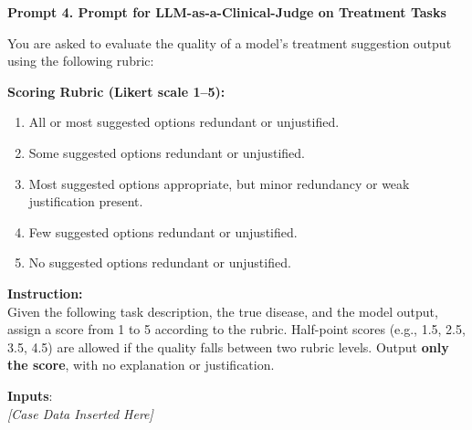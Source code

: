 \documentclass[10pt,journal,compsoc, onecolumn]{IEEEtran}
\begin{document}
\begin{baselinebox}
    \textbf{Prompt 4. Prompt for LLM-as-a-Clinical-Judge on Treatment Tasks}
    
    \vspace{1em}
    You are asked to evaluate the quality of a model’s treatment suggestion output using the following rubric:
    
    \vspace{1em}
    \textbf{Scoring Rubric (Likert scale 1–5):}
    \begin{enumerate}[label=\arabic*., leftmargin=*, noitemsep, topsep=2pt]
        \item All or most suggested options redundant or unjustified.  
        \item Some suggested options redundant or unjustified.
        \item Most suggested options appropriate, but minor redundancy or weak justification present.
        \item Few suggested options redundant or unjustified.  
        \item No suggested options redundant or unjustified.  
    \end{enumerate}
    
    \vspace{1em}
    \textbf{Instruction:}\\
    Given the following task description, the true disease, and the model output, assign a score from 1 to 5 according to the rubric. Half-point scores (e.g., 1.5, 2.5, 3.5, 4.5) are allowed if the quality falls between two rubric levels. Output \textbf{only the score}, with no explanation or justification.
    
    \vspace{1em}
    \textbf{Inputs}:\\
    \textit{[Case Data Inserted Here]}
\end{baselinebox}

\vspace*{\fill} %
\clearpage %


\vspace*{6.5cm}
\end{document}
